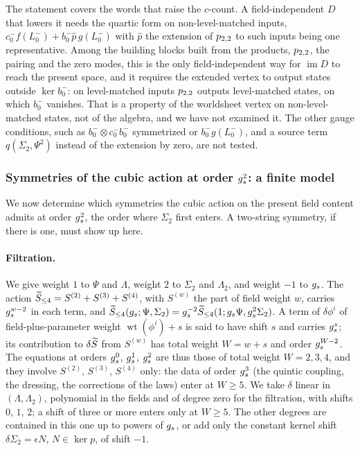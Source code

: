 The statement covers the words that raise the $c$-count.
A field-independent $D$ that lowers it needs the quartic form on non-level-matched inputs, $c_0^- f(L_0^-) + b_0^- \hat p \, g(L_0^-)$ with $\hat p$ the extension of $\sprod{2}{2}$ to such inputs being one representative.
Among the building blocks built from the products, $\sprod{2}{2}$, the pairing and the zero modes, this is the only field-independent way for $\operatorname{im} D$ to reach the present space, and it requires the extended vertex to output states outside $\ker b_0^-$: on level-matched inputs $\sprod{2}{2}$ outputs level-matched states, on which $b_0^-$ vanishes.
That is a property of the worldsheet vertex on non-level-matched states, not of the algebra, and we have not examined it.
The other gauge conditions, such as $b_0^- \otimes c_0^- b_0^-$ symmetrized or $b_0^- g(L_0^-)$, and a source term $q(\Sigma_2, \Psi^2)$ instead of the extension by zero, are not tested.

\subsubsection{Symmetries of the cubic action at order \texorpdfstring{$\gs^2$}{gs2}: a finite model}
\label{sec:gauge-bv:model}


We now determine which symmetries the cubic action on the present field content admits at order $\gs^2$, the order where $\Sigma_2$ first enters.
A two-string symmetry, if there is one, must show up here.

\paragraph{Filtration.}
We give weight $1$ to $\Psi$ and $\Lambda$, weight $2$ to $\Sigma_2$ and $\Lambda_2$, and weight $-1$ to $\gs$.
The action $\caction[\le 4] = S^{(2)} + S^{(3)} + S^{(4)}$, with $S^{(w)}$ the part of field weight $w$, carries $\gs^{w-2}$ in each term, and $\caction[\le 4](\gs; \Psi, \Sigma_2) = \gs^{-2} \caction[\le 4](1; \gs \Psi, \gs^2 \Sigma_2)$.
A term of $\delta \phi^i$ of field-plus-parameter weight $\operatorname{wt}(\phi^i) + s$ is said to have shift $s$ and carries $\gs^s$; its contribution to $\delta \caction$ from $S^{(w)}$ has total weight $W = w + s$ and order $\gs^{W-2}$.
The equations at orders $\gs^0$, $\gs^1$, $\gs^2$ are thus those of total weight $W = 2, 3, 4$, and they involve $S^{(2)}$, $S^{(3)}$, $S^{(4)}$ only: the data of order $\gs^3$ (the quintic coupling, the dressing, the corrections of the laws) enter at $W \ge 5$.
We take $\delta$ linear in $(\Lambda, \Lambda_2)$, polynomial in the fields and of degree zero for the filtration, with shifts $0$, $1$, $2$; a shift of three or more enters only at $W \ge 5$.
The other degrees are contained in this one up to powers of $\gs$, or add only the constant kernel shift $\delta \Sigma_2 = \epsilon N$, $N \in \ker p$, of shift $-1$.

